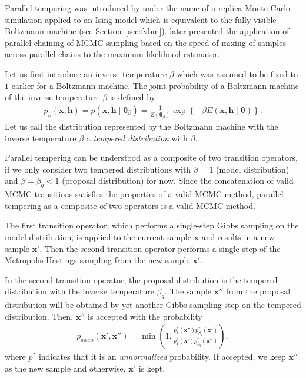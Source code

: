 \documentclass{now}
\newcommand{\vect}[1]{\mathbf{#1}}
\newcommand{\vects}[1]{\boldsymbol{#1}}
\newcommand{\vh}[0]{\vect{h}}
\newcommand{\vx}[0]{\vect{x}}
\newcommand{\TT}[0]{{\vects{\theta}}}
\begin{document}
Parallel tempering was introduced by \citet{Swendsen1986}
under the name of a replica Monte Carlo simulation applied
to an Ising model which is equivalent to the fully-visible
Boltzmann machine (see Section~\ref{sec:fvbm}).
\citet{Geyer1991} later presented the application of
parallel chaining of MCMC sampling based on the speed of
mixing of samples across parallel chains to the maximum
likelihood estimator.

Let us first introduce an inverse temperature $\beta$
which was assumed to be fixed to $1$ earlier for a Boltzmann
machine. The joint probability
of a Boltzmann machine of the inverse temperature $\beta$ is defined by
\begin{align*}
    p_{\beta} (\vx, \vh) = p (\vx, \vh \mid \TT_\beta) =
    \frac{1}{Z(\TT_\beta)} \exp\left\{ -\beta E(\vx, \vh
    \mid \TT) \right\}.
\end{align*}
Let us call the distribution represented by the Boltzmann
machine with the inverse temperature $\beta$ a
\textit{tempered distribution} with $\beta$.

Parallel tempering can be understood as a composite of two
transition operators, if we only consider two
tempered distributions with $\beta=1$ (model distribution)
and $\beta = \beta_q < 1$ (proposal distribution) for now.  Since
the concatenation of valid MCMC transitions satisfies the
properties of a valid MCMC method, parallel tempering as a
composite of two operators is a valid MCMC method.

The first transition operator, which performs a single-step
Gibbs sampling on the model distribution, is applied to the
current sample $\vx$ and results in a new sample $\vx'$.
Then the second transition operator performs a single step
of the Metropolis-Hastings sampling from the new sample
$\vx'$.

In the second transition operator, the proposal distribution
is the tempered distribution with the inverse temperature
$\beta_q$. The sample $\vx''$ from the proposal distribution
will be obtained by yet another Gibbs sampling step on the
tempered distribution. Then, $\vx''$ is accepted with the
probability
\begin{align}
    \label{eq:pt_swap_prob}
    p_\text{swap} (\vx', \vx'') = \min \left( 1, \frac{p_1^*
    (\vx'') p^*_{\beta_q} (\vx')}{p^*_1(\vx')
    p^*_{\beta_q}(\vx'')}
    \right),
\end{align}
where $p^*$ indicates that it is an \textit{unnormalized}
probability. If accepted, we keep $\vx''$ as the new
sample and otherwise, $\vx'$ is kept.
\end{document}
